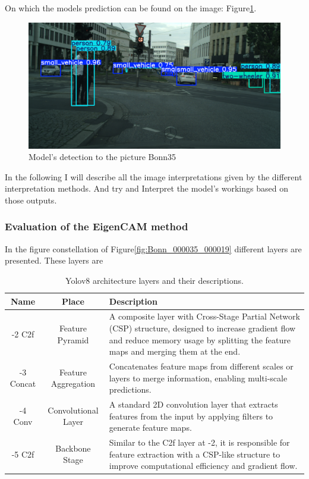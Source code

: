 On which the models prediction can be found on the image: Figure\ref{fig:detbonn35}.
\begin{figure}[h]
    \centering
    \includegraphics[width=1\linewidth]{figures/bonn_000035_000019_leftImg8bit}
    \caption{Model's detection to the picture Bonn35 }
    \label{fig:detbonn35}
\end{figure}

In the following I will describe all the image interpretations given by the different interpretation methods. And try and Interpret the model's workings based on those outputs.

\newpage

\subsubsection{Evaluation of the EigenCAM method}\label{subsubsec:evaluation-of-the-eigencam-method}

In the figure constellation of Figure\ref{fig:Bonn_000035_000019} different layers are presented.
These layers are

\begin{table}[h]
    \centering
    \begin{tabular}{|c|c|p{10cm}|}
        \hline
        \textbf{Name} & \textbf{Place} & \textbf{Description} \\
         \hline
         -2 C2f  & Feature Pyramid & A composite layer with Cross-Stage Partial Network (CSP) structure, designed to increase gradient flow and reduce memory usage by splitting the feature maps and merging them at the end. \\
         \hline
         -3 Concat & Feature Aggregation & Concatenates feature maps from different scales or layers to merge information, enabling multi-scale predictions. \\
         \hline
         -4 Conv & Convolutional Layer & A standard 2D convolution layer that extracts features from the input by applying filters to generate feature maps. \\
         \hline
         -5 C2f  & Backbone Stage & Similar to the C2f layer at -2, it is responsible for feature extraction with a CSP-like structure to improve computational efficiency and gradient flow. \\
         \hline
    \end{tabular}
    \caption{Yolov8 architecture layers and their descriptions.}
    \label{tab:yolov8_layers}
\end{table}


